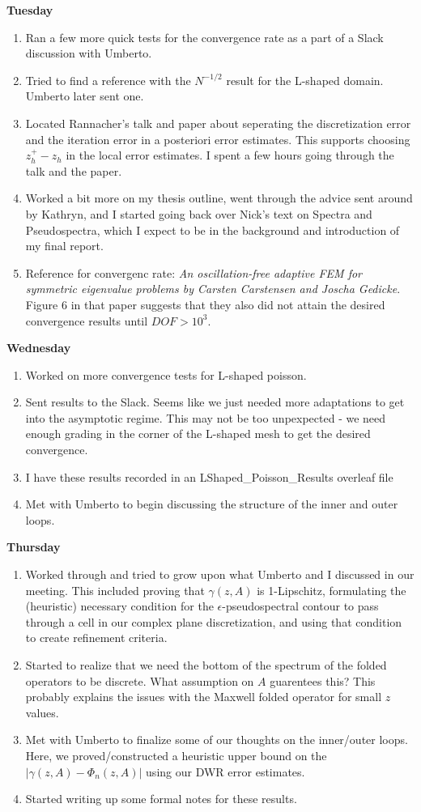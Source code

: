\documentclass[12pt,a4paper]{article}
\begin{document}
\textbf{Tuesday}
\begin{enumerate}
\item Ran a few more quick tests for the convergence rate as a part of a Slack discussion with Umberto.
\item Tried to find a reference with the $N^{-1/2}$ result for the L-shaped domain. Umberto later sent one.
\item Located Rannacher's talk and paper about seperating the discretization error and the iteration error in a posteriori error estimates. This supports choosing $z_h^+ - z_h$ in the local error estimates. I spent a few hours going through the talk and the paper.
\item Worked a bit more on my thesis outline, went through the advice sent around by Kathryn, and I started going back over Nick's text on Spectra and Pseudospectra, which I expect to be in the background and introduction of my final report. 
\item Reference for convergenc rate: \textit{An oscillation-free adaptive FEM for symmetric
eigenvalue problems by Carsten Carstensen and Joscha Gedicke}. Figure 6 in that paper suggests that they also did not attain the desired convergence results until $DOF > 10^3.$
\end{enumerate}

\textbf{Wednesday}
\begin{enumerate}
    \item Worked on more convergence tests for L-shaped poisson. 
    \item Sent results to the Slack. Seems like we just needed more adaptations to get into the asymptotic regime. This may not be too unpexpected - we need enough grading in the corner of the L-shaped mesh to get the desired convergence. 
    \item I have these results recorded in an LShaped\_Poisson\_Results overleaf file
    \item Met with Umberto to begin discussing the structure of the inner and outer loops.
\end{enumerate}

\textbf{Thursday}
\begin{enumerate}
    \item Worked through and tried to grow upon what Umberto and I discussed in our meeting. This included proving that $\gamma(z, A)$ is 1-Lipschitz, formulating the (heuristic) necessary condition for the $\epsilon$-pseudospectral contour to pass through a cell in our complex plane discretization, and using that condition to create refinement criteria. 
    \item Started to realize that we need the bottom of the spectrum of the folded operators to be discrete. What assumption on $A$ guarentees this? This probably explains the issues with the Maxwell folded operator for small $z$ values.
    \item Met with Umberto to finalize some of our thoughts on the inner/outer loops. Here, we proved/constructed a heuristic upper bound on the $|\gamma(z,A) - \Phi_n(z,A)|$ using our DWR error estimates.
    \item Started writing up some formal notes for these results.
\end{enumerate}
\end{document}
